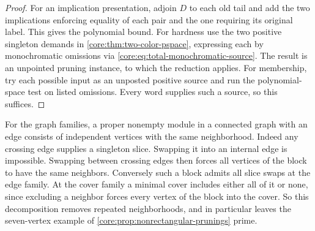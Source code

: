 \begin{proof}
For an implication presentation, adjoin $D$ to each old tail and
add the two implications enforcing equality of each pair and the
one requiring its original label. This gives the polynomial bound.
For hardness use the two positive singleton demands in
\cref{core:thm:two-color-pspace}, expressing each by monochromatic
omissions via \eqref{core:eq:total-monochromatic-source}. The
result is an unpointed pruning instance, to which the reduction
applies. For membership, try each possible input as an unposted
positive source and run the polynomial-space test on listed
omissions. Every word supplies such a source, so this suffices.
\end{proof}

For the graph families, a proper nonempty module in
a connected graph with an edge consists of independent vertices
with the same neighborhood. Indeed any crossing edge supplies a
singleton slice. Swapping it into an internal edge is impossible.
Swapping between crossing edges then forces all vertices of the
block to have the same neighbors. Conversely such a block admits
all slice swaps at the edge family. At the cover family a minimal
cover includes either all of it or none, since excluding a neighbor
forces every vertex of the block into the cover. So this
decomposition removes repeated neighborhoods, and in particular
leaves the seven-vertex example of
\cref{core:prop:nonrectangular-prunings} prime.
